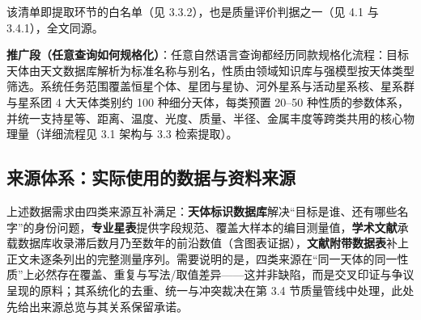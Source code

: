 \noindent 该清单即提取环节的白名单（见 3.3.2），也是质量评价判据之一（见 4.1 与 3.4.1），全文同源。

\medskip
\noindent\textbf{推广段（任意查询如何规格化）}：任意自然语言查询都经历同款规格化流程：目标天体由天文数据库解析为标准名称与别名，性质由领域知识库与强模型按天体类型筛选。系统任务范围覆盖恒星个体、星团与星协、河外星系与活动星系核、星系群与星系团 4 大天体类别约 100 种细分天体，每类预置 20--50 种性质的参数体系，并统一支持星等、距离、温度、光度、质量、半径、金属丰度等跨类共用的核心物理量（详细流程见 3.1 架构与 3.3 检索提取）。

\subsection{来源体系：实际使用的数据与资料来源}

上述数据需求由四类来源互补满足：\textbf{天体标识数据库}解决“目标是谁、还有哪些名字”的身份问题，\textbf{专业星表}提供字段规范、覆盖大样本的编目测量值，\textbf{学术文献}承载数据库收录滞后数月乃至数年的前沿数值（含图表证据），\textbf{文献附带数据表}补上正文未逐条列出的完整测量序列。需要说明的是，四类来源在“同一天体的同一性质”上必然存在覆盖、重复与写法/取值差异——这并非缺陷，而是交叉印证与争议呈现的原料；其系统化的去重、统一与冲突裁决在第 3.4 节质量管线中处理，此处先给出来源总览与其关系保留承诺。

